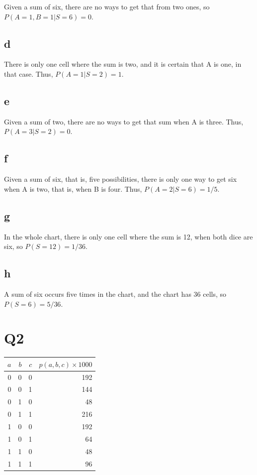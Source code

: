 \documentclass{article}
\begin{document}
Given a sum of six, there are no ways to get that from two ones, so 
$ P(A=1, B=1 | S=6) = 0 $.

\subsection{d}

There is only one cell where the sum is two, and it is certain that A is one, 
in that case. Thus, $ P(A=1 | S=2) = 1 $.

\subsection{e}

Given a sum of two, there are no ways to get that sum when A is three. Thus, 
$ P(A=3|S=2) = 0 $.

\subsection{f}

Given a sum of six, that is, five possibilities, there is only one way to get 
six when A is two, that is, when B is four. Thus, $ P(A=2|S=6) = 1/5 $.

\subsection{g}

In the whole chart, there is only one cell where the sum is 12, when both dice 
are six, so $ P(S=12) = 1/36 $.

\subsection{h}

A sum of six occurs five times in the chart, and the chart has 36 cells, so 
$ P(S=6) = 5/36 $.

\section{Q2}

\begin{tabular}{r r r | r }
	$a$ & $b$ & $c$ & $p(a, b, c) \times 1000 $\\
	\hline
	0 & 0 & 0 & 192 \\
	0 & 0 & 1 & 144 \\
	0 & 1 & 0 & 48 \\
	0 & 1 & 1 & 216 \\
	1 & 0 & 0 & 192 \\
	1 & 0 & 1 & 64 \\
	1 & 1 & 0 & 48 \\
	1 & 1 & 1 & 96 \\
\end{tabular}
\end{document}
